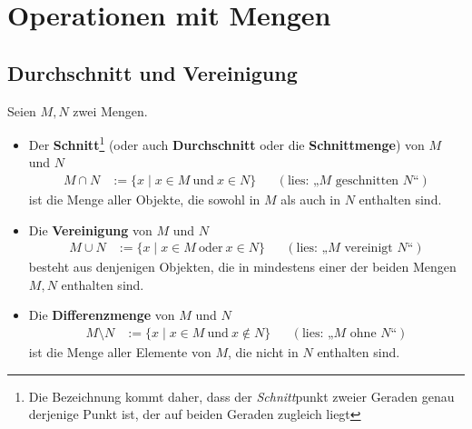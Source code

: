 \section{Operationen mit Mengen}


\subsection*{Durchschnitt und Vereinigung}


\begin{defin}      \label{def:capcup}
    Seien $M,N$ zwei Mengen.
    \begin{itemize}
        \item Der \textbf{Schnitt}\footnote{Die Bezeichnung kommt daher, dass der \emph{Schnitt}punkt zweier Geraden genau derjenige Punkt ist, der auf beiden Geraden zugleich liegt} (oder auch \textbf{Durchschnitt} oder die \textbf{Schnittmenge}) von $M$ und $N$ 
        \begin{align*}
            M \cap N & := \{x \mid x \in M\ \text{und}\ x \in N\} && (\text{lies: „$M$ geschnitten $N$“})
        \end{align*}
        ist die Menge aller Objekte, die sowohl in $M$ als auch in $N$ enthalten sind.
        \item Die \textbf{Vereinigung} von $M$ und $N$
        \begin{align*}
            M \cup N & := \{x \mid x \in M\ \text{oder}\ x \in N\} && (\text{lies: „$M$ vereinigt $N$“})
        \end{align*}
        besteht aus denjenigen Objekten, die in mindestens einer der beiden Mengen $M,N$ enthalten sind.
        \item Die \textbf{Differenzmenge} von $M$ und $N$
        \begin{align*}
            M \setminus N & := \{ x \mid x \in M \ \text{und}\ x \notin N \}  && (\text{lies: „$M$ ohne $N$“})
        \end{align*}
        ist die Menge aller Elemente von $M$, die nicht in $N$ enthalten sind.


\end{itemize}
\end{defin}
